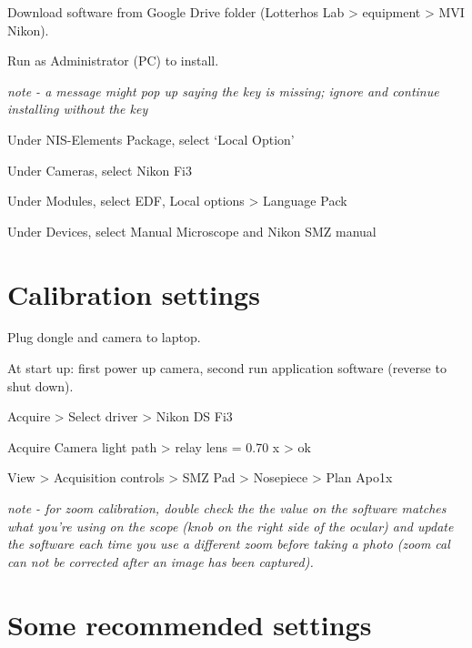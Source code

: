 \documentclass[
  letterpaper,
  DIV=11,
  numbers=noendperiod]{scrreprt}
\begin{document}

Download software from Google Drive folder (Lotterhos Lab \textgreater{}
equipment \textgreater{} MVI Nikon).

Run as Administrator (PC) to install.

\emph{note - a message might pop up saying the key is missing; ignore
and continue installing without the key}

Under NIS-Elements Package, select `Local Option'

Under Cameras, select Nikon Fi3

Under Modules, select EDF, Local options \textgreater{} Language Pack

Under Devices, select Manual Microscope and Nikon SMZ manual

\hypertarget{calibration-settings}{%
\section*{\texorpdfstring{\textbf{Calibration
settings}}{Calibration settings}}\label{calibration-settings}}


Plug dongle and camera to laptop.

At start up: first power up camera, second run application software
(reverse to shut down).

Acquire \textgreater{} Select driver \textgreater{} Nikon DS Fi3

Acquire Camera light path \textgreater{} relay lens = 0.70 x
\textgreater{} ok

View \textgreater{} Acquisition controls \textgreater{} SMZ Pad
\textgreater{} Nosepiece \textgreater{} Plan Apo1x

\emph{note - for zoom calibration, double check the the value on the
software matches what you're using on the scope (knob on the right side
of the ocular) and update the software each time you use a different
zoom before taking a photo (zoom cal can not be corrected after an image
has been captured).}

\hypertarget{some-recommended-settings}{%
\section*{\texorpdfstring{\textbf{Some recommended
settings}}{Some recommended settings}}\label{some-recommended-settings}}
\end{document}
